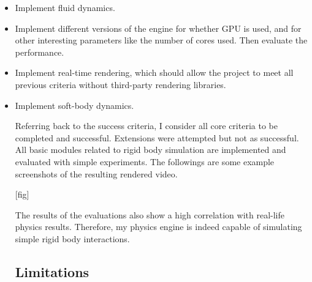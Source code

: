 \documentclass[12pt,a4paper,twoside,openright]{report}
\begin{document}
\begin{itemize}
\item Implement fluid dynamics.

\item Implement different versions of the engine for whether GPU is used, and for other interesting parameters like the number of cores used. 
Then evaluate the performance.

\item Implement real-time rendering, which should allow the project to meet all previous criteria without third-party rendering libraries. 

\item Implement soft-body dynamics.

Referring back to the success criteria, I consider all core criteria to be completed and successful. Extensions were attempted but not as successful. All basic modules related to rigid body simulation are implemented and evaluated with simple experiments. The followings are some example screenshots of the resulting rendered video.

\begin{center}
\end{center}

[fig]

The results of the evaluations also show a high correlation with real-life physics results. Therefore, my physics engine is indeed capable of simulating simple rigid body interactions.

\subsection{Limitations}


\end{itemize}
\end{document}
